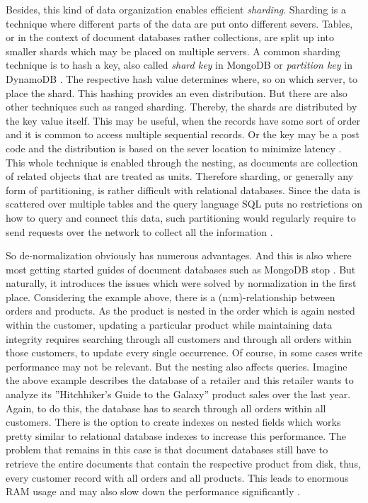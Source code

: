 Besides, this kind of data organization enables efficient \emph{sharding}. Sharding is a technique where different parts of the data are put onto different severs. Tables, or in the context of document databases rather collections, are split up into smaller shards which may be placed on multiple servers. A common sharding technique is to hash a key, also called \emph{shard key} in MongoDB \cite{MongoDBShardKey} or \emph{partition key} in DynamoDB \cite{DynamoDBPartitionKey}. The respective hash value determines where, so on which server, to place the shard. This hashing provides an even distribution. But there are also other techniques such as ranged sharding. Thereby, the shards are distributed by the key value itself. This may be useful, when the records have some sort of order and it is common to access multiple sequential records. Or the key may be a post code and the distribution is based on the sever location to minimize latency \cite{NoSQLDistilled}. This whole technique is enabled through the nesting, as documents are collection of related objects that are treated as units. Therefore sharding, or generally any form of partitioning, is rather difficult with relational databases. Since the data is scattered over multiple tables and the query language SQL puts no restrictions on how to query and connect this data, such partitioning would regularly require to send requests over the network to collect all the information \cite{NoSQLDistilled}.\par 
So de-normalization obviously has numerous advantages. And this is also where most getting started guides of document databases such as MongoDB stop \cite{MongoDBGettingStarted}. But naturally, it introduces the issues which were solved by normalization in the first place. Considering the example above, there is a (n:m)-relationship between orders and products. As the product is nested in the order which is again nested within the customer, updating a particular product while maintaining data integrity requires searching through all customers and through all orders within those customers, to update every single occurrence. Of course, in some cases write performance may not be relevant. But the nesting also affects queries. Imagine the above example describes the database of a retailer and this retailer wants to analyze its ''Hitchhiker's Guide to the Galaxy'' product sales over the last year. Again, to do this, the database has to search through all orders within all customers. There is the option to create indexes on nested fields which works pretty similar to relational database indexes to increase this performance. The problem that remains in this case is that document databases still have to retrieve the entire documents that contain the respective product from disk, thus, every customer record with all orders and all products. This leads to enormous RAM usage and may also slow down the performance significantly \cite{MongoDBAppliedDesign}.\\\\
